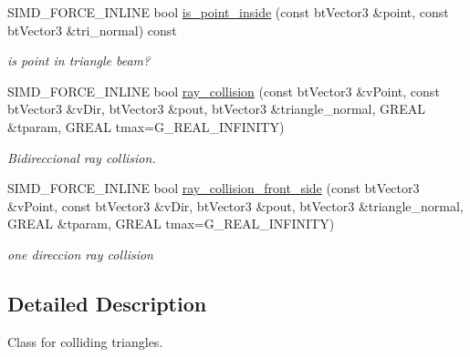 \begin{CompactItemize}
\item 
SIMD\_\-FORCE\_\-INLINE bool \hyperlink{class_g_i_m___t_r_i_a_n_g_l_e_921acb2a97263653fce72384f177a953}{is\_\-point\_\-inside} (const btVector3 \&point, const btVector3 \&tri\_\-normal) const 
\begin{CompactList}\small\item\em is point in triangle beam? \item\end{CompactList}\item 
\hypertarget{class_g_i_m___t_r_i_a_n_g_l_e_2942ca686a994c2d112ad356c2a4e7ad}{
SIMD\_\-FORCE\_\-INLINE bool \hyperlink{class_g_i_m___t_r_i_a_n_g_l_e_2942ca686a994c2d112ad356c2a4e7ad}{ray\_\-collision} (const btVector3 \&vPoint, const btVector3 \&vDir, btVector3 \&pout, btVector3 \&triangle\_\-normal, GREAL \&tparam, GREAL tmax=G\_\-REAL\_\-INFINITY)}
\label{class_g_i_m___t_r_i_a_n_g_l_e_2942ca686a994c2d112ad356c2a4e7ad}

\begin{CompactList}\small\item\em Bidireccional ray collision. \item\end{CompactList}\item 
\hypertarget{class_g_i_m___t_r_i_a_n_g_l_e_2b333284fd573994acf89b9085a61927}{
SIMD\_\-FORCE\_\-INLINE bool \hyperlink{class_g_i_m___t_r_i_a_n_g_l_e_2b333284fd573994acf89b9085a61927}{ray\_\-collision\_\-front\_\-side} (const btVector3 \&vPoint, const btVector3 \&vDir, btVector3 \&pout, btVector3 \&triangle\_\-normal, GREAL \&tparam, GREAL tmax=G\_\-REAL\_\-INFINITY)}
\label{class_g_i_m___t_r_i_a_n_g_l_e_2b333284fd573994acf89b9085a61927}

\begin{CompactList}\small\item\em one direccion ray collision \item\end{CompactList}\end{CompactItemize}


\subsection{Detailed Description}
Class for colliding triangles. 

